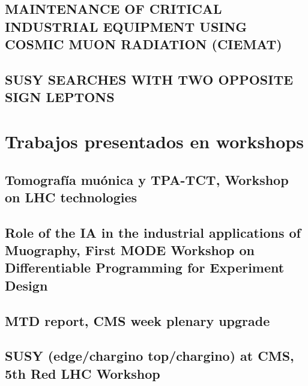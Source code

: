 \documentclass[a4paper, 11pt, twoside, openright]{report}
\begin{document}
\subsection{MAINTENANCE OF CRITICAL INDUSTRIAL EQUIPMENT USING COSMIC MUON RADIATION (CIEMAT)}


\subsection{SUSY SEARCHES WITH TWO OPPOSITE SIGN LEPTONS}


\section{Trabajos presentados en workshops}

\subsection{Tomografía muónica y TPA-TCT, Workshop on LHC technologies}


\subsection{Role of the IA in the industrial applications of Muography, First MODE Workshop on Differentiable Programming for Experiment Design}


\subsection{MTD report, CMS week plenary upgrade}


\subsection{SUSY (edge/chargino top/chargino) at CMS, 5th Red LHC Workshop}

\end{document}
